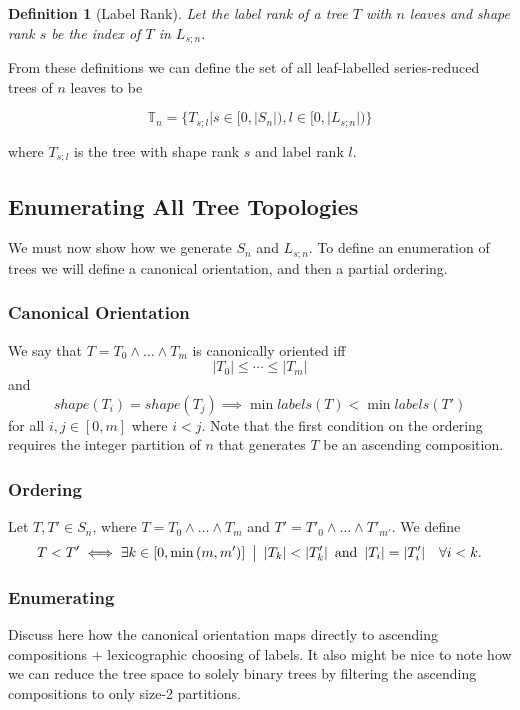 \documentclass{article}
\newcommand{\halfopen}[2]{[#1, #2)}
\newcommand{\wlw}{\wedge{} \ldots{} \wedge{}}
\newcommand{\nleaves}[1]{|#1|}
\newcommand{\shape}[1]{shape(#1)}
\newcommand{\labels}[1]{labels(#1)}
\newcommand{\smallgap}{{\hspace{0.5em}}}
\newtheorem{definition}{Definition}
\begin{document}
\begin{definition}[Label Rank]
    Let the label rank of a tree $T$ with $n$ leaves and shape rank $s$
    be the index of $T$ in $L_{s;n}$.
\end{definition}

From these definitions we can define the set of all leaf-labelled
series-reduced trees of $n$ leaves to be

\[
    \mathbb{T}_n = \{ T_{s;l} | s \in \halfopen{0}{|S_n|},
                                l \in \halfopen{0}{|L_{s;n}|} \}
\]

where $T_{s;l}$ is the tree with shape rank $s$ and label rank $l$.

\subsection{Enumerating All Tree Topologies}
We must now show how we generate $S_n$ and $L_{s;n}$. To define an enumeration
of trees we will define a canonical orientation, and then a partial ordering.

\subsubsection{Canonical Orientation}
We say that $T = T_0 \wlw{} T_m$ is canonically oriented iff
\[
    \nleaves{T_0} \leq \cdots \leq \nleaves{T_m}
\]
and
\[
    \shape{T_i} = \shape{T_j} \implies \min{\labels{T}} < \min{\labels{T'}}
\]
for all $i,j \in [0, m]$ where $i < j$. Note that the first condition on the ordering
requires the integer partition of $n$ that generates $T$ be an ascending composition.

\subsubsection{Ordering}
Let $T, T' \in S_n$, where $T = T_0 \wlw{} T_m$ and $T' = T'_0 \wlw{} T'_{m'}$.
We define
\[
    T < T' \iff \exists k \in [0, \min{(m, m')}]
    \smallgap \big{|} \smallgap
    \nleaves{T_k} < \nleaves{T'_k}
    \smallgap \text{and} \smallgap
    \nleaves{T_i} = \nleaves{T'_i} \quad \forall i < k.
\]

\subsubsection{Enumerating}
Discuss here how the canonical orientation maps directly to ascending compositions
+ lexicographic choosing of labels. It also might be nice to note how we can reduce
the tree space to solely binary trees by filtering the ascending compositions to
only size-2 partitions.
\end{document}
